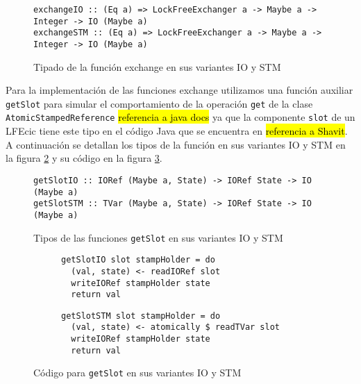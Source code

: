 \begin{figure}[H]
  \centering
  \begin{verbatim}
exchangeIO :: (Eq a) => LockFreeExchanger a -> Maybe a -> Integer -> IO (Maybe a)
exchangeSTM :: (Eq a) => LockFreeExchanger a -> Maybe a -> Integer -> IO (Maybe a)
  \end{verbatim}
  \caption{Tipado de la función exchange en sus variantes IO y STM}
  \label{fig:exchange-types}
\end{figure}

Para la implementación de las funciones exchange utilizamos una función auxiliar \texttt{getSlot} para simular el comportamiento de la operación \texttt{get} de la clase \texttt{AtomicStampedReference}  \hl{referencia a java docs} ya que la componente \texttt{slot} de un LFEcic tiene este tipo en el código Java que se encuentra en \hl{referencia a Shavit}. A continuación se detallan los tipos de la función en sus variantes IO y STM en la figura \ref{fig:getSlot-types} y su código en la figura \ref{fig:getSlot-code}.

\begin{figure}[H]
  \centering
  \begin{verbatim}
getSlotIO :: IORef (Maybe a, State) -> IORef State -> IO (Maybe a)
getSlotSTM :: TVar (Maybe a, State) -> IORef State -> IO (Maybe a)
  \end{verbatim}
  \caption{Tipos de las funciones \texttt{getSlot} en sus variantes IO y STM}
  \label{fig:getSlot-types}
\end{figure}

\begin{figure}[H]
  \centering
    \begin{subfigure}[b]{0.5\textwidth}
    \begin{verbatim}
getSlotIO slot stampHolder = do
  (val, state) <- readIORef slot
  writeIORef stampHolder state
  return val
    \end{verbatim}
  \end{subfigure}
  \begin{subfigure}[b]{0.5\textwidth}
    \begin{verbatim}
getSlotSTM slot stampHolder = do
  (val, state) <- atomically $ readTVar slot
  writeIORef stampHolder state
  return val
    \end{verbatim}
  \end{subfigure}
  \caption{Código para \texttt{getSlot} en sus variantes IO y STM}
  \label{fig:getSlot-code}
\end{figure}


